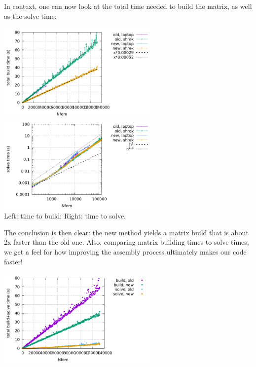 In context, one can now look at the total time needed to build the matrix,
as well as the solve time:
\begin{center}
\includegraphics[width=8cm]{python_codes/fieldstone_176/results/build.pdf}
\includegraphics[width=8cm]{python_codes/fieldstone_176/results/solve.pdf}\\
{\captionfont Left: time to build; Right: time to solve.}
\end{center}
The conclusion is then clear: the new method yields a matrix build that 
is about 2x faster than the old one.
Also, comparing matrix building times to solve times, we get a feel for how 
improving the assembly process ultimately makes our code faster!
\begin{center}
\includegraphics[width=8cm]{python_codes/fieldstone_176/results/build_solve.pdf}
\end{center}

